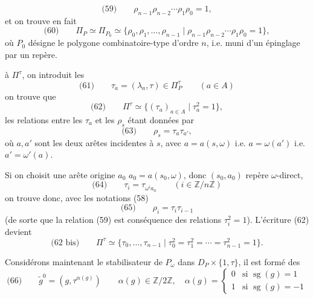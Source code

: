 \documentclass[11pt,a4paper]{article}
\begin{document}

\[
  \text{(59)}\qquad \rho_{n-1}\rho_{n-2}\cdots\rho_1\rho_0 = 1 ,
\]
et on trouve en fait
\[
  \text{(60)}\qquad \Pi_P \simeq \Pi_{P_0} \simeq
  \{\rho_0,\rho_1,\ldots,\rho_{n-1} \mid \rho_{n-1}\rho_{n-2}\cdots\rho_1\rho_0 = 1\} ,
\]
où $P_0$ désigne le polygone combinatoire-type d'ordre $n$, i.e. muni d'un épinglage par un repère.

 à $\Pi^\tau$, on introduit les
\[
  \text{(61)}\qquad \tau_a = (\lambda_a, \tau) \in \Pi_P^\tau \qquad (a \in A)
\]
on trouve que
\[
  \text{(62)}\qquad \Pi^\tau \simeq \{(\tau_a)_{a\in A} \mid \tau_a^2 = 1\} ,
\]
les relations entre les $\tau_a$ et les $\rho_s$ étant données par
\[
  \text{(63)}\qquad \rho_s = \tau_a \tau_{a'} ,
\]
où $a, a'$ sont les deux arêtes incidentes à $s$, \struck{\ill{}} avec \struck{\ill{}} $a = a(s,\omega)$ i.e. $a = \omega(a')$ i.e. $a' = \omega'(a)$.

Si on choisit \struck{\ill{}} une arête origine $a_0$  $a_0 = a(s_0,\omega)$, donc $(s_0,a_0)$ repère $\omega$-direct,  
\[
  \text{(64)}\qquad \tau_i = \tau_{\omega^i a_0} \qquad (i \in \mathbb{Z}/n\mathbb{Z})
\]
on trouve donc, avec les notations (58)
\[
  \text{(65)}\qquad \rho_i = \tau_i \tau_{i-1}
\]
(de sorte que la relation (59) est conséquence des relations $\tau_i^2 = 1$). L'écriture (62) devient
\[
  \text{(62 bis)}\qquad \Pi^\tau \simeq \{\tau_0,\ldots,\tau_{n-1} \mid \tau_0^2 = \tau_1^2 = \cdots = \tau_{n-1}^2 = 1\} .
\]

Considérons maintenant le stabilisateur de $P_\omega$ dans $D_P \times \{1,\tau\}$, il est formé des
\[
  \text{(66)}\qquad \tilde g^{0} = (g, \tau^{\alpha(g)}) \qquad
  \alpha(g) \in \mathbb{Z}/2\mathbb{Z},\quad
  \alpha(g) = \begin{cases} 0 & \text{si } \operatorname{sg}(g) = 1 \\ 1 & \text{si } \operatorname{sg}(g) = -1 \end{cases}
\]
\end{document}

